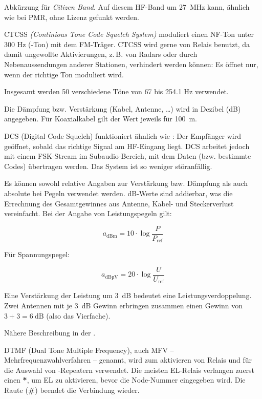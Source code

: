 {}

{Abkürzung für \textit{Citizen Band}. Auf diesem HF-Band um 27 MHz kann, ähnlich wie bei PMR, ohne Lizenz gefunkt werden.}

{CTCSS \textit{(Continious Tone Code Squelch System)} moduliert einen NF-Ton unter 300 Hz (-Ton) mit dem FM-Träger. CTCSS wird gerne von Relais benutzt, da damit ungewollte Aktivierungen, z. B. von Radars oder durch Nebenaussendungen anderer Stationen, verhindert werden können: Es öffnet nur, wenn der richtige Ton moduliert wird.

Insgesamt werden 50 verschiedene Töne von 67 bis 254.1 Hz verwendet.}

{Die Dämpfung bzw. Verstärkung (Kabel, Antenne, …) wird in Dezibel (dB) angegeben. Für Koaxialkabel gilt der Wert jeweils für 100 m.}

{DCS (Digital Code Squelch) funktioniert ähnlich wie : Der Empfänger wird geöffnet, sobald das richtige Signal am HF-Eingang liegt. DCS arbeitet jedoch mit einem FSK-Stream im Subaudio-Bereich, mit dem Daten (bzw. bestimmte Codes) übertragen werden. Das System ist so weniger störanfällig.}

{Es können sowohl relative Angaben zur Verstärkung bzw. Dämpfung als auch absolute bei Pegeln verwendet werden. dB-Werte sind addierbar, was die Errechnung des Gesamtgewinnes aus Antenne, Kabel- und Steckerverlust vereinfacht.
Bei der Angabe von Leistungspegeln gilt:

\[ a_\mathrm{dBm} = 10 \cdot \log \frac{P}{P_\mathrm{ref}} \]

Für Spannungspegel:

\[ a_\mathrm{dBµV} = 20 \cdot \log \frac{U}{U_\mathrm{ref}} \]

Eine Verstärkung der Leistung um 3 dB bedeutet eine Leistungsverdoppelung. Zwei Antennen mit je 3 dB Gewinn erbringen zusammen einen Gewinn von $3 + 3 = 6~\mathrm{dB}$ (also das Vierfache).

Nähere Beschreibung in der .}

{DTMF (Dual Tone Multiple Frequency), auch MFV – Mehrfrequenzwahlverfahren – genannt, wird zum aktivieren von Relais und für die Auswahl von -Repeatern verwendet. Die meisten EL-Relais verlangen zuerst einen \textbf{*}, um EL zu aktivieren, bevor die Node-Nummer eingegeben wird. Die Raute (\textbf{\#}) beendet die Verbindung wieder.}


